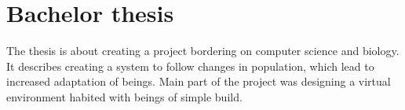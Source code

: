 \section{Bachelor thesis}
{\small The thesis is about creating a project bordering on computer science and biology. It
describes creating a system to follow changes in population, which lead to increased
adaptation of beings. Main part of the project was designing a virtual environment habited
with beings of simple build.}


